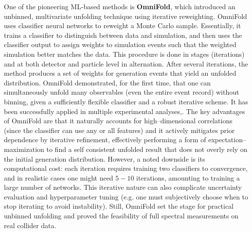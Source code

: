         One of the pioneering ML-based methods is \textbf{OmniFold}, which introduced an unbinned, multivariate unfolding technique using iterative reweighting.
        OmniFold uses classifier neural networks to reweight a Monte Carlo sample.
        Essentially, it trains a classifier to distinguish between data and simulation, and then uses the classifier output to assign weights to simulation events such that the weighted simulation better matches the data.
        This procedure is done in stages (iterations) and at both detector and particle level in alternation.
        After several iterations, the method produces a set of weights for generation events that yield an unfolded distribution.
        OmniFold demonstrated, for the first time, that one can simultaneously unfold many observables (even the entire event record) without binning, given a sufficiently flexible classifier and a robust iterative scheme.\kd{}
        It has been successfully applied in multiple experimental analyses,\kd{}.
        The key advantages of OmniFold are that it naturally accounts for high--dimensional correlations (since the classifier can use any or all features) and it actively mitigates prior dependence by iterative refinement, effectively performing a form of expectation--maximization to find a self consistent unfolded result that does not overly rely on the initial generation distribution.
        However, a noted downside is its computational cost: each iteration requires training two classifiers to convergence, and in realistic cases one might need $5 - 10$ iterations, amounting to training a large number of networks.
        This iterative nature can also complicate uncertainty evaluation and hyperparameter tuning (e.g. one must subjectively choose when to stop iterating to avoid instability).
        Still, OmniFold set the stage for practical unbinned unfolding and proved the feasibility of full spectral measurements on real collider data.

